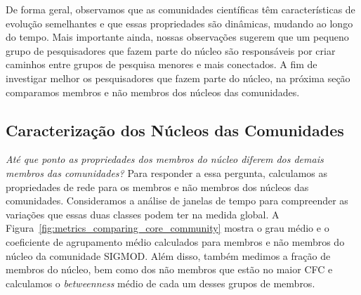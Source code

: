 \documentclass[12pt]{article}
\begin{document}
De forma geral, observamos que as comunidades científicas têm características de evolução semelhantes e que essas 
propriedades são dinâmicas, mudando ao longo do tempo. Mais importante ainda, nossas observações sugerem que 
um pequeno grupo de pesquisadores que fazem parte do núcleo são responsáveis por criar caminhos entre grupos de 
pesquisa menores e mais conectados. A fim de investigar melhor os pesquisadores que fazem parte do núcleo, 
na próxima seção comparamos membros e não membros dos núcleos das comunidades.

\subsection{Caracterização dos Núcleos das Comunidades}

\textit{Até que ponto as propriedades dos membros do núcleo diferem dos demais membros das comunidades?} Para responder a essa 
pergunta, calculamos as propriedades de rede para os membros e não membros dos núcleos das comunidades. Consideramos 
a análise de janelas de tempo para compreender as variações que essas duas classes podem ter na medida global. 
A Figura~\ref{fig:metrics_comparing_core_community} mostra o grau médio e o coeficiente de agrupamento médio calculados para 
membros e não membros do núcleo da comunidade SIGMOD. Além disso, 
também medimos a fração de membros do núcleo, bem como dos não membros que estão no maior CFC e calculamos 
o \textit{betweenness} médio de cada um desses grupos de membros.
\end{document}
